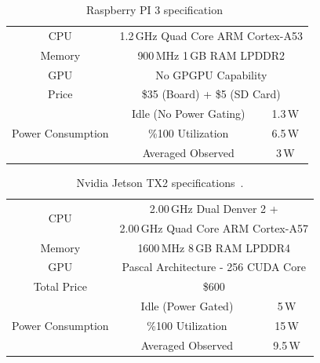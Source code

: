 \documentclass[sigplan]{acmart}
\begin{document}
\renewcommand{\arraystretch}{0.7}
\begin{table}[t]
    \small
	\centering
	\vspace{-10pt}
	\captionsetup{singlelinecheck=on,aboveskip=1pt}
	\caption{Raspberry PI 3 specification~\cite{pi3}}
	\begin{tabular}{c | c | c}
		\toprule
        CPU & \multicolumn{2}{c}{1.2\,GHz Quad Core ARM Cortex-A53} \\
        Memory &  \multicolumn{2}{c}{900\,MHz 1\,GB RAM LPDDR2} \\
        GPU & \multicolumn{2}{c}{No GPGPU Capability} \\
        Price & \multicolumn{2}{c}{\$35 (Board) + \$5 (SD Card)} \\
        \midrule
        \multirow{3}{2cm}{\centering Power Consumption }
        &Idle (No Power Gating) & 1.3\,W \\
        &\%100 Utilization & 6.5\,W \\
        & Averaged Observed & 3\,W \\
		\bottomrule
	\end{tabular}
	\label{tab:pi}
	\vspace{-10pt}
\end{table} \renewcommand{\arraystretch}{1}


\renewcommand{\arraystretch}{0.7}
\begin{table}[t]
    \small
	\centering
	\vspace{0pt}
	\captionsetup{singlelinecheck=on,aboveskip=1pt}
	\caption{Nvidia Jetson TX2 specifications~\cite{jetson}.}
	\begin{tabular}{c | c | c}
		\toprule
        \multirow{2}{*}{\centering CPU } & \multicolumn{2}{c}{2.00\,GHz Dual Denver 2 +} \\
        & \multicolumn{2}{c}{2.00\,GHz Quad Core ARM Cortex-A57} \\
        \arrayrulecolor{black!20}\midrule\arrayrulecolor{black}
        Memory &  \multicolumn{2}{c}{1600\,MHz 8\,GB RAM LPDDR4} \\
        GPU & \multicolumn{2}{c}{Pascal Architecture - 256 CUDA Core} \\
        Total Price & \multicolumn{2}{c}{\$600} \\
        \midrule
        \multirow{3}{2cm}{\centering Power Consumption }
        &Idle (Power Gated)  & 5\,W \\
        &\%100 Utilization & 15\,W \\
        &Averaged Observed & 9.5\,W \\
		\bottomrule
	\end{tabular}
	\label{tab:jetson}
	\vspace{-10pt}
\end{table} \renewcommand{\arraystretch}{1}
\end{document}
